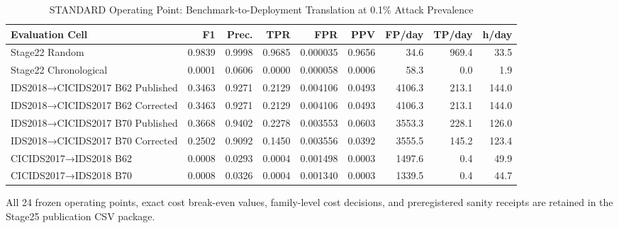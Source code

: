 
\begin{table}[t]
\caption{STANDARD Operating Point: Benchmark-to-Deployment Translation at 0.1\% Attack Prevalence}
\centering
\small
\begin{tabular}{lrrrrrrrr}
\hline
Evaluation Cell & F1 & Prec. & TPR & FPR & PPV & FP/day & TP/day & h/day \\
\hline
Stage22 Random & 0.9839 & 0.9998 & 0.9685 & 0.000035 & 0.9656 & 34.6 & 969.4 & 33.5 \\
Stage22 Chronological & 0.0001 & 0.0606 & 0.0000 & 0.000058 & 0.0006 & 58.3 & 0.0 & 1.9 \\
IDS2018→CICIDS2017 B62 Published & 0.3463 & 0.9271 & 0.2129 & 0.004106 & 0.0493 & 4106.3 & 213.1 & 144.0 \\
IDS2018→CICIDS2017 B62 Corrected & 0.3463 & 0.9271 & 0.2129 & 0.004106 & 0.0493 & 4106.3 & 213.1 & 144.0 \\
IDS2018→CICIDS2017 B70 Published & 0.3668 & 0.9402 & 0.2278 & 0.003553 & 0.0603 & 3553.3 & 228.1 & 126.0 \\
IDS2018→CICIDS2017 B70 Corrected & 0.2502 & 0.9092 & 0.1450 & 0.003556 & 0.0392 & 3555.5 & 145.2 & 123.4 \\
CICIDS2017→IDS2018 B62 & 0.0008 & 0.0293 & 0.0004 & 0.001498 & 0.0003 & 1497.6 & 0.4 & 49.9 \\
CICIDS2017→IDS2018 B70 & 0.0008 & 0.0326 & 0.0004 & 0.001340 & 0.0003 & 1339.5 & 0.4 & 44.7 \\
\hline
\end{tabular}
\label{tab:stage25_standard_translation}
\end{table}

\noindent
All 24 frozen operating points, exact cost break-even values, family-level
cost decisions, and preregistered sanity receipts are retained in the
Stage25 publication CSV package.
